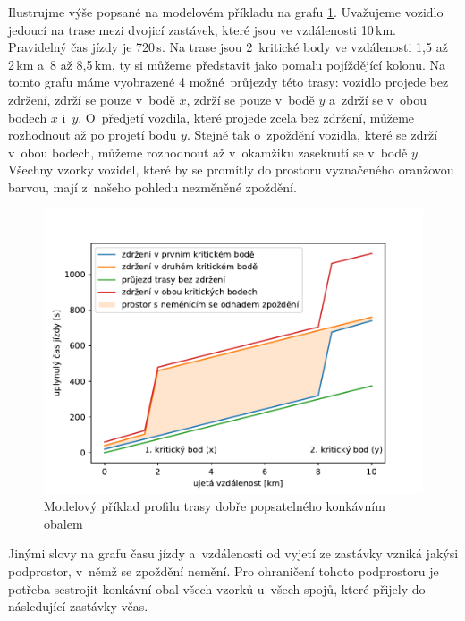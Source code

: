 \bigbreak

Ilustrujme výše popsané na modelovém příkladu na grafu \ref{fig:concave_hull}. Uvažujeme vozidlo jedoucí na trase mezi dvojicí zastávek, které jsou ve vzdálenosti 10\,km. Pravidelný čas jízdy je 720\,s. Na trase jsou 2~kritické body ve vzdálenosti 1,5 až 2\,km a~8 až 8,5\,km, ty si můžeme představit jako pomalu pojíždějící kolonu. Na tomto grafu máme vyobrazené 4 možné průjezdy této trasy: vozidlo projede bez zdržení, zdrží se pouze v~bodě $x$, zdrží se pouze v~bodě $y$ a~zdrží se v~obou bodech $x$ i~$y$. O~předjetí vozdila, které projede zcela bez zdržení, můžeme rozhodnout až po projetí bodu $y$. Stejně tak o~zpoždění vozidla, které se zdrží v~obou bodech, můžeme rozhodnout až v~okamžiku zaseknutí se v~bodě $y$. Všechny vzorky vozidel, které by se promítly do prostoru vyznačeného oranžovou barvou, mají z~našeho pohledu nezměněné zpoždění.


\begin{figure}
\centering
  \includegraphics[width=\linewidth]{../img/concave_hull}
  \caption{Modelový příklad profilu trasy dobře popsatelného konkávním obalem}
  \label{fig:concave_hull}
\end{figure}


\bigbreak

Jinými slovy na grafu času jízdy a~vzdálenosti od vyjetí ze zastávky vzniká jakýsi podprostor, v~němž se zpoždění nemění. Pro ohraničení tohoto podprostoru je potřeba sestrojit konkávní obal všech vzorků u~všech spojů, které přijely do následující zastávky včas.


\bigbreak

